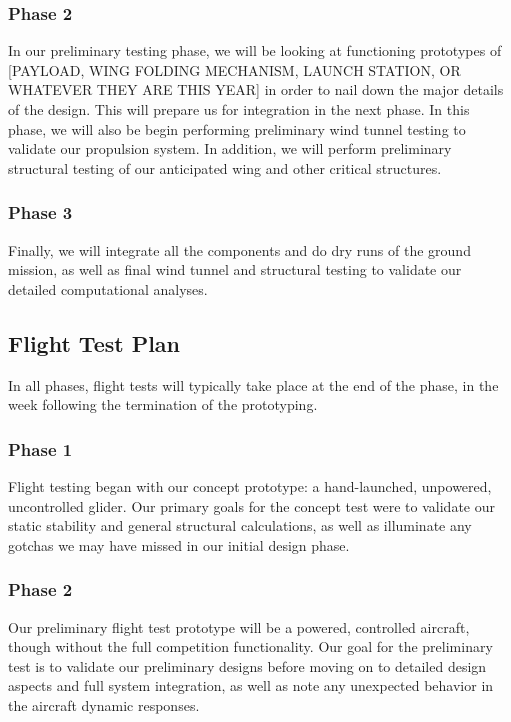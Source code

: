 \documentclass[proposal]{byu-aero}
\begin{document}
\subsubsection{Phase 2} In our preliminary testing phase, we will be looking at functioning prototypes of {\color{BYUred}[PAYLOAD, WING FOLDING MECHANISM, LAUNCH STATION, OR WHATEVER THEY ARE THIS YEAR]} in order to nail down the major details of the design.  This will prepare us for integration in the next phase.  In this phase, we will also be begin performing preliminary wind tunnel testing to validate our propulsion system. In addition, we will perform preliminary structural testing of our anticipated wing and other critical structures.

\subsubsection{Phase 3} Finally, we will integrate all the components and do dry runs of the ground mission, as well as final wind tunnel and structural testing to validate our detailed computational analyses.





\subsection{Flight Test Plan}
\label{ssec:FlightTestingPlan}

In all phases, flight tests will typically take place at the end of the phase, in the week following the termination of the prototyping.

\subsubsection{Phase 1} Flight testing began with our concept prototype: a hand-launched, unpowered, uncontrolled glider.  Our primary goals for the concept test were to validate our static stability and general structural calculations, as well as illuminate any gotchas we may have missed in our initial design phase.

\subsubsection{Phase 2} Our preliminary flight test prototype will be a powered, controlled aircraft, though without the full competition functionality.  Our goal for the preliminary test is to validate our preliminary designs before moving on to detailed design aspects and full system integration, as well as note any unexpected behavior in the aircraft dynamic responses. 
\end{document}
